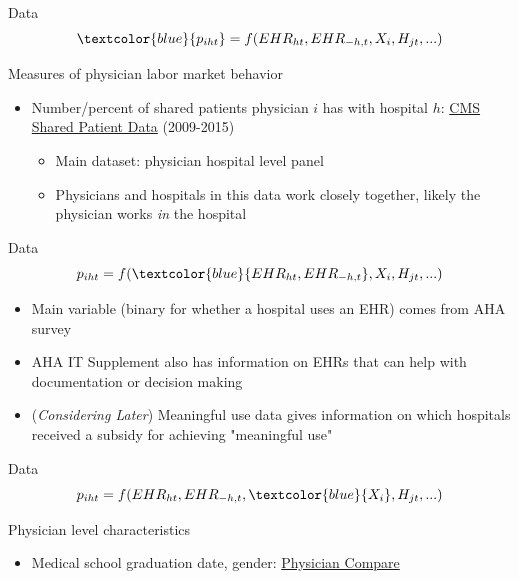 \documentclass[10pt]{beamer}
\begin{document}
\begin{frame}{Data}
\begin{equation*}
    \textcolor{blue}{p_{iht}}=f(EHR_{ht},EHR_{-h,t},X_i,H_{jt},...)
\end{equation*}

\vspace{3mm}

Measures of physician labor market behavior
\begin{itemize}
    \item Number/percent of shared patients physician $i$ has with hospital $h$: \underline{CMS Shared Patient Data} (2009-2015)
    \begin{itemize}
        \item Main dataset: physician hospital level panel
        \item Physicians and hospitals in this data work closely together, likely the physician works \textit{in} the hospital
    \end{itemize}
\end{itemize}
\end{frame}

\begin{frame}{Data}
\begin{equation*}
    p_{iht}=f(\textcolor{blue}{EHR_{ht},EHR_{-h,t}},X_i,H_{jt},...)
\end{equation*}

\vspace{5mm}

\begin{itemize}
    \item Main variable (binary for whether a hospital uses an EHR) comes from AHA survey
    \item AHA IT Supplement also has information on EHRs that can help with documentation or decision making
    \item (\textit{Considering Later}) Meaningful use data gives information on which hospitals received a subsidy for achieving "meaningful use"
\end{itemize}
\end{frame}

\begin{frame}{Data}
\begin{equation*}
    p_{iht}=f(EHR_{ht},EHR_{-h,t},\textcolor{blue}{X_i},H_{jt},...)
\end{equation*}

\vspace{5mm}

Physician level characteristics
\begin{itemize}
    \item Medical school graduation date, gender: \underline{Physician Compare}
\end{itemize}
\end{frame}
\end{document}

